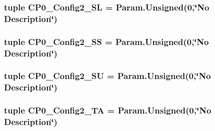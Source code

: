 \label{classMipsCPU_1_1BaseMipsCPU_a288566473c627d5d943bdb535070c6a8}
\hypertarget{classMipsCPU_1_1BaseMipsCPU_a9454f5e6694924d587b7b8a754a11d1b}{
\subsubsection[{CP0\_\-Config2\_\-SL}]{\setlength{\rightskip}{0pt plus 5cm}tuple {\bf CP0\_\-Config2\_\-SL} = Param.Unsigned(0,\char`\"{}No Description\char`\"{})}}
\label{classMipsCPU_1_1BaseMipsCPU_a9454f5e6694924d587b7b8a754a11d1b}
\hypertarget{classMipsCPU_1_1BaseMipsCPU_ab97cbbcf21b6e230918b18b06994a27f}{
\subsubsection[{CP0\_\-Config2\_\-SS}]{\setlength{\rightskip}{0pt plus 5cm}tuple {\bf CP0\_\-Config2\_\-SS} = Param.Unsigned(0,\char`\"{}No Description\char`\"{})}}
\label{classMipsCPU_1_1BaseMipsCPU_ab97cbbcf21b6e230918b18b06994a27f}
\hypertarget{classMipsCPU_1_1BaseMipsCPU_a9069a5a32d904206d9512619e0e5b6b2}{
\subsubsection[{CP0\_\-Config2\_\-SU}]{\setlength{\rightskip}{0pt plus 5cm}tuple {\bf CP0\_\-Config2\_\-SU} = Param.Unsigned(0,\char`\"{}No Description\char`\"{})}}
\label{classMipsCPU_1_1BaseMipsCPU_a9069a5a32d904206d9512619e0e5b6b2}
\hypertarget{classMipsCPU_1_1BaseMipsCPU_aa29587ae710f53b37f05bf85275b1f83}{
\subsubsection[{CP0\_\-Config2\_\-TA}]{\setlength{\rightskip}{0pt plus 5cm}tuple {\bf CP0\_\-Config2\_\-TA} = Param.Unsigned(0,\char`\"{}No Description\char`\"{})}}
